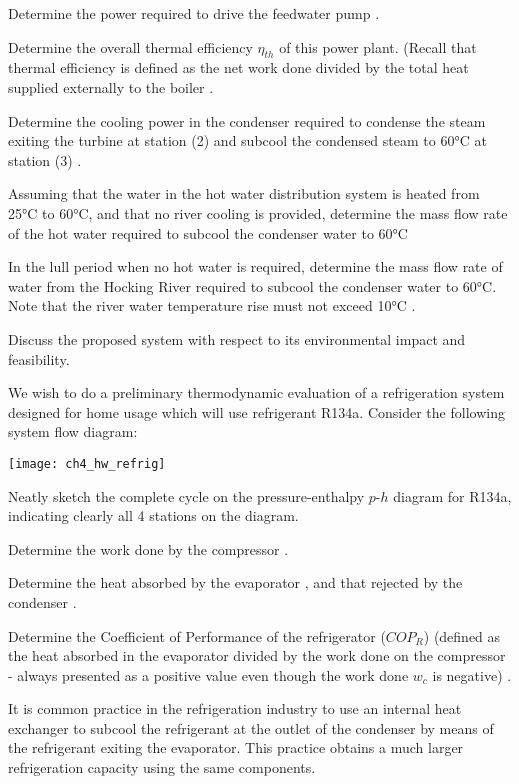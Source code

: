 \begin{homework}
\begin{questionparts}
  \item Determine the power required to drive the feedwater pump \answer{ [2.69 kW]}.
  \item Determine the overall thermal efficiency $\eta_{th}$ of this power plant. (Recall that thermal efficiency is defined as the net work done divided by the total heat supplied externally to the boiler \answer{[23\%]}.
  \item Determine the cooling power in the condenser required to condense the steam exiting the turbine at station (2) and subcool the condensed steam to 60°C at station (3) \answer{[1628 kW]}.
  \item Assuming that the water in the hot water distribution system is heated from 25°C to 60°C, and that no river cooling is provided, determine the mass flow rate of the hot water required to subcool the condenser water to 60°C \answer{ [11.1 kg/s]}
  \item In the lull period when no hot water is required, determine the mass flow rate of water from the Hocking River required to subcool the condenser water to 60°C. Note that the river water temperature rise must not exceed 10°C \answer{ [39 kg/s]}.
  \item Discuss the proposed system with respect to its environmental impact and feasibility.
  \end{questionparts}
  \question We wish to do a preliminary thermodynamic evaluation of a refrigeration system designed for home usage which will use refrigerant R134a. Consider the following system flow diagram:
  \begin{center}
    \texttt{[image: ch4\_hw\_refrig]}
  \end{center}
  \begin{questionparts}
  \item Neatly sketch the complete cycle on the pressure-enthalpy $p$-$h$ diagram for R134a, indicating clearly all 4 stations on the diagram.
  \item Determine the work done by the compressor \answer{ [54 kJ/kg]}.
  \item Determine the heat absorbed by the evaporator \answer{ [137 kJ/kg]}, and that rejected by the condenser \answer{ [191 kJ/kg]}.
  \item Determine the Coefficient of Performance of the refrigerator ($COP_R$) (defined as the heat absorbed in the evaporator divided by the work done on the compressor - always presented as a positive value even though the work done $w_c$ is negative) \answer{[$COP_R$ = 2.53]}.
  \end{questionparts}
  \newpage
  \question It is common practice in the refrigeration industry to use an internal heat exchanger to subcool the refrigerant at the outlet of the condenser by means of the refrigerant exiting the evaporator. This practice obtains a much larger refrigeration capacity using the same components.


\end{homework}
